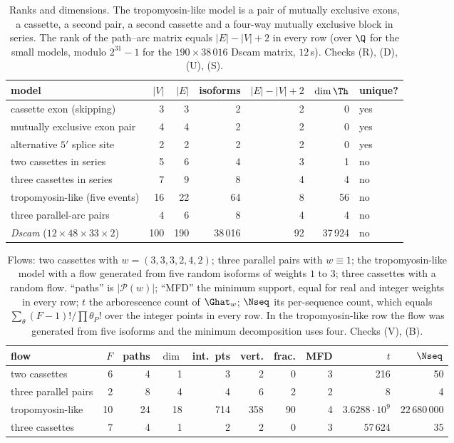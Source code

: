 \begin{table}[t]
\centering
\small
\begin{tabular}{lrrrrrl}
\toprule
model & $|V|$ & $|E|$ & isoforms & $|E|-|V|+2$ & $\dim\Th$ & unique?\\
\midrule
cassette exon (skipping)                 &   3 &   3 &      2 &  2 &     0 & yes\\
mutually exclusive exon pair             &   4 &   4 &      2 &  2 &     0 & yes\\
alternative $5'$ splice site             &   2 &   2 &      2 &  2 &     0 & yes\\
two cassettes in series                  &   5 &   6 &      4 &  3 &     1 & no\\
three cassettes in series                &   7 &   9 &      8 &  4 &     4 & no\\
tropomyosin-like (five events)           &  16 &  22 &     64 &  8 &    56 & no\\
three parallel-arc pairs                 &   4 &   6 &      8 &  4 &     4 & no\\
\emph{Dscam} ($12\times48\times33\times2$) & 100 & 190 & 38\,016 & 92 & 37\,924 & no\\
\bottomrule
\end{tabular}
\caption{Ranks and dimensions. The tropomyosin-like model is a pair of mutually exclusive
exons, a cassette, a second pair, a second cassette and a four-way mutually exclusive block
in series. The rank of the path--arc matrix equals $|E|-|V|+2$ in every row (over $\Q$ for
the small models, modulo $2^{31}-1$ for the $190\times38\,016$ Dscam matrix, $12$\,s).
Checks (R), (D), (U), (S).}
\label{ch17:tab:models}
\end{table}

\begin{table}[t]
\centering
\small
\begin{tabular}{lrrrrrrrrr}
\toprule
flow & $F$ & paths & $\dim$ & int.\ pts & vert. & frac. & MFD & $t$ & $\Nseq$\\
\midrule
two cassettes      &  6 &  4 &  1 &   3 &   2 &  0 & 3 & 216 & 50\\
three parallel pairs &  2 &  8 &  4 &   4 &   6 &  2 & 2 & 8 & 4\\
tropomyosin-like   & 10 & 24 & 18 & 714 & 358 & 90 & 4 & $3.6288\cdot10^{9}$ & $22\,680\,000$\\
three cassettes    &  7 &  4 &  1 &   2 &   2 &  0 & 3 & 57\,624 & 35\\
\bottomrule
\end{tabular}
\caption{Flows: two cassettes with $w=(3,3,3,2,4,2)$; three parallel pairs with $w\equiv1$;
the tropomyosin-like model with a flow generated from five random isoforms of weights $1$ to
$3$; three cassettes with a random flow. ``paths'' is $|\mathcal P(w)|$; ``MFD'' the minimum
support, equal for real and integer weights in every row; $t$ the arborescence count of
$\Ghat_w$; $\Nseq$ its per-sequence count, which equals $\sum_\theta(F-1)!/\prod\theta_P!$
over the integer points in every row. In the tropomyosin-like row the flow was generated from
five isoforms and the minimum decomposition uses four. Checks (V), (B).}
\label{ch17:tab:flows}
\end{table}


